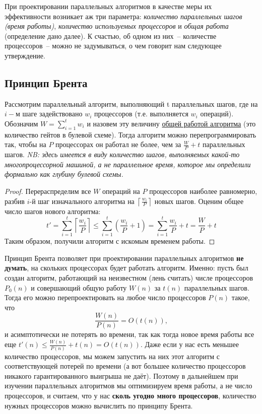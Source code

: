При проектировании параллельных алгоритмов в качестве меры их эффективности возникает аж три параметра: \textit{количество параллельных шагов (время работы)}, \textit{количество используемых процессоров} и \textit{общая работа} (определение дано далее). К счастью, об одном из них~-- количестве процессоров~-- можно не задумываться, о чем говорит нам следующее утверждение.

\subsection{Принцип Брента}
\begin{theorem*}
	Рассмотрим параллельный алгоритм, выполняющий t параллельных шагов, где на $i-$м шаге задействовано $w_i$ процессоров (т.е. выполняется $w_i$ операций). Обозначим $W=\sum\limits_{i=1}^t w_i$ и назовем эту величину \underline{общей работой алгоритма} (это количество гейтов в булевой схеме). Тогда алгоритм можно перепрограммировать так, чтобы на $P$ процессорах он работал не более, чем за $\frac{W}{P} + t$ параллельных шагов. \emph{NB: здесь имеется в виду количество шагов, выполняемых какой-то многопроцессорной машиной, а не параллельное время, которое мы определили формально как глубину булевой схемы.}
\end{theorem*}

\begin{proof}
	Перераспределим все $W$ операций на $P$ процессоров наиболее равномерно, разбив $i$-й шаг изначального алгоритма на $\left\lceil\frac{w_i}{P}\right\rceil$ новых шагов. Оценим общее число шагов нового алгоритма:
$$t' = \sum_{i=1}^t \left\lceil\frac{w_i}{P}\right\rceil \leq \sum_{i=1}^t \left(\frac{w_i}{P} + 1\right) = \sum_{i=1}^t \frac{w_i}{P} + t = \frac{W}{P} + t$$Таким образом, получили алгоритм с искомым временем работы.
\end{proof}

\begin{nb*} Принцип Брента позволяет при проектировании параллельных алгоритмов \textbf{не думать}, на скольких процессорах будет работать алгоритм. Именно: пусть был создан алгоритм, работающий на неизвестном (лень считать) числе процессоров $P_0(n)$ и совершающий общую работу $W(n)$ за $t(n)$ параллельных шагов. Тогда его можно перепроектировать на любое число процессоров $P(n)$ такое, что $$\frac{W(n)}{P(n)} = O(t(n)),$$ и асимптотически не потерять во времени, так как тогда новое время работы все еще $t'(n) \leq \frac{W(n)}{P(n)} + t(n) = O(t(n))$. Даже если у нас есть меньшее количество процессоров, мы можем запустить на них этот алгоритм с соответствующей потерей по времени (а вот большее количество процессоров никакого гарантированного выигрыша не даёт). Поэтому в дальнейшем при изучении параллельных алгоритмов мы оптимизируем время работы, а не число процессоров, и считаем, что у нас \textbf{сколь угодно много процессоров}, количество нужных процессоров можно вычислить по принципу Брента.
\end{nb*}

